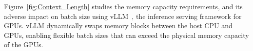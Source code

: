     

Figure~\ref{fig:Context_Length} studies the memory capacity requirements, and its adverse impact on batch size using vLLM~\cite{vLLM}, the \sota{} inference serving framework for GPUs. vLLM 
dynamically swaps memory blocks between the host CPU and GPUs, enabling flexible batch sizes that can exceed the physical memory capacity of the GPUs. 

